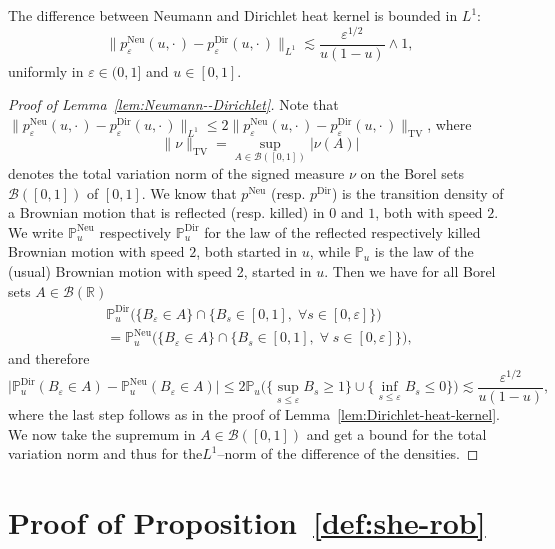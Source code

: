 \documentclass[AHL,Unicode,longabstracts]{cedram}
\DeclareMathOperator{\Dir}{Dir}
\DeclareMathOperator{\Neu}{Neu}
\DeclareMathOperator{\TV}{TV}
\newcommand{\mc}[1]{{\mathcal #1}}
\renewcommand{\mc}[1]{{\mathcal #1}}
\renewcommand{\leq}{\leqslant}
\renewcommand{\geq}{\geqslant}
\let\oldforall\forall
\renewcommand*{\forall}{\mathrel{\oldforall}}
\begin{document}
\begin{lemm}\label{lem:Neumann--Dirichlet}
The difference between Neumann and Dirichlet heat kernel is bounded in $L^1$:
\[
\big\| p^{\Neu}_{\varepsilon} (u, \cdot\,) - p^{\Dir}_{\varepsilon} (u, \cdot\,)
\big\|_{L^1} \lesssim \frac{\varepsilon^{1 / 2}}{u (1 - u)} \wedge 1,
\]
uniformly in $\varepsilon \in (0,1]$ and $u \in [0,1]$.
\end{lemm}

\begin{proof}[Proof of Lemma~\ref{lem:Neumann--Dirichlet}]
Note that $\| p^{\Neu}_{\varepsilon} (u, \cdot\,) - p_{\varepsilon}^{\Dir} (u,
\cdot\,) \|_{L^1} \leq 2 \| p^{\Neu}_{\varepsilon} (u,
\cdot\,) - p_{\varepsilon}^{\Dir} (u, \cdot\,) \|_{\TV}$, where
\[
\| \nu \|_{\TV} = \sup_{A \in \mc B([0,1])} |\nu(A)|
\]
denotes the total variation norm of the signed measure $\nu$ on the Borel sets $\mc B([0,1])$ of $[0,1]$. We know that $p^{\Neu}$ (resp. $p^{\Dir}$) is the transition density of a Brownian motion that is reflected (resp. killed) in $0$ and $1$, both with speed $2$. We write $\mathbb{P}^{\Neu}_u$ respectively $\mathbb{P}^{\Dir}_u$ for the law of the reflected respectively killed Brownian motion with speed $2$, both started in $u$, while $\mathbb{P}_u$ is the law of the (usual) Brownian motion with speed 2, started in $u$. Then we have for all Borel sets $A \in \mathcal{B} (\mathbb{R})$
\begin{multline*}
\mathbb{P}^{\Dir}_u \big(\big\{ B_{\varepsilon} \in A \big\} \cap \big\{ B_s \in [0, 1],\; \forall s
\in [0, \varepsilon] \big\}\big)\\=\mathbb{P}^{\Neu}_u \big(\big\{ B_{\varepsilon} \in A \big\}
\cap \big\{ B_s \in [0, 1], \; \forall \; s \in [0, \varepsilon] \big\}\big),
\end{multline*}
and therefore
\[
\big| \mathbb{P}^{\Dir}_u (B_{\varepsilon} \in A) -\mathbb{P}^{\Neu}_u (B_{\varepsilon} \in A) \big| \leq 2\mathbb{P}_u \big(\big\{ \sup_{s \leq
\varepsilon} B_s \geq 1 \big\} \cup \big\{ \inf_{s \leq \varepsilon} B_s
\leq 0 \big\}\big) \lesssim \frac{\varepsilon^{1 / 2}}{u (1 - u)},
\]
where the last step follows as in the proof of Lemma~\ref{lem:Dirichlet-heat-kernel}. We now take the supremum in $A\in \mc B([0,1])$ and get a bound for the total variation norm and thus for the\linebreak $L^1$--norm of the difference of the densities.
\end{proof}

\section{Proof of Proposition~\ref{def:she-rob}}\label{app:she-proof}
\end{document}
